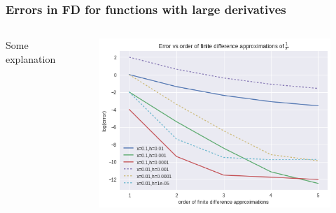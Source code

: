 \documentclass[hyperref={bookmarks=false},aspectratio=169]{beamer}
\begin{document}
\begin{frame}
  \frametitle{Errors in FD for functions with large derivatives}
  \begin{columns}
    Some explanation
    \begin{figure}[hbt!]
      \centering
      \includegraphics[width=\textwidth]{images/1_x_error_vs_order.png}
    \end{figure}
  \end{columns}

\end{frame}
\end{document}
